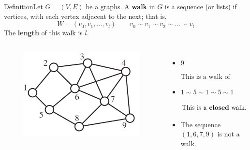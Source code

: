 \documentclass{beamer}
\def\bl[#1]#2{\begin{block}{#1}#2\end{block}}
\def\itemb{\begin{itemize}}
\def\iteme{\end{itemize}}
\begin{document}
\begin{frame}
\bl[Definition]{Let $G=(V,E)$ be a graphs. A \textbf{walk} in $G$ is a sequence (or lists) if vertices, with each vertex adjacent to the next; that is,
\[
W=(v_0,v_1,\dots,v_l)\qquad v_0\sim v_1\sim v_2\sim\dots\sim v_l
\]
The \textbf{length} of this walk is $l$. }

\begin{columns}
\begin{figure}
\centering
\includegraphics[scale=0.3]{WalkGraph.pdf}
\end{figure}
\itemb
\item $9$
\bl[]{\vspace{-0.1cm}
\[
\textrm{This is a walk of length zero.}
\]}
\item $1\sim 5\sim 1\sim 5\sim 1 $
\bl[]{\vspace{-0.1cm}
\[
\textrm{This is a \textbf{closed} walk.}
\]}
\item The sequence $(1,6,7,9)$ is not a walk.
\iteme
\end{columns}
\end{frame}
\end{document}
